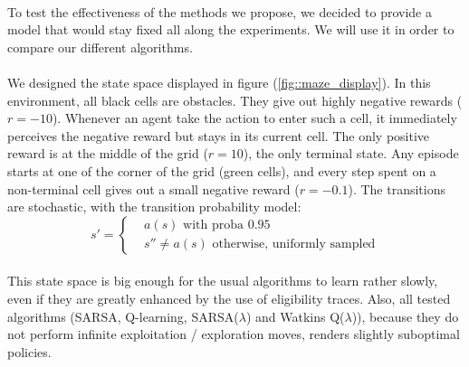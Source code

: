 \documentclass[a4paper]{report}
\begin{document}
{{			\paragraph{} To test the effectiveness of the methods we propose, we decided to provide a model that would stay fixed all along the experiments. We will use it in order to compare our different algorithms.
			
			\paragraph{} We designed the state space displayed in figure (\ref{fig::maze_display}). In this environment, all black cells are obstacles. They give out highly negative rewards ($r=-10$). Whenever an agent take the action to enter such a cell, it immediately perceives the negative reward but stays in its current cell. The only positive reward is at the middle of the grid ($r=10$), the only terminal state. Any episode starts at one of the corner of the grid (green cells), and every step spent on a non-terminal cell gives out a small negative reward ($r=-0.1$). The transitions are stochastic, with the transition probability model: 
			\begin{equation}
				s' = \left\{ 
					\begin{aligned}
						&a(s) \text{ with proba } 0.95 \\
						&s'' \neq a(s) \text{ otherwise, uniformly sampled}
					\end{aligned}\right.
			\end{equation}
			 
			 \paragraph{} This state space is big enough for the usual algorithms to learn rather slowly, even if they are greatly enhanced by the use of eligibility traces. Also, all tested algorithms (SARSA, Q-learning, SARSA($\lambda$) and Watkins Q($\lambda$)), because they do not perform infinite exploitation / exploration moves, renders slightly suboptimal policies. 
			
}}
\end{document}
